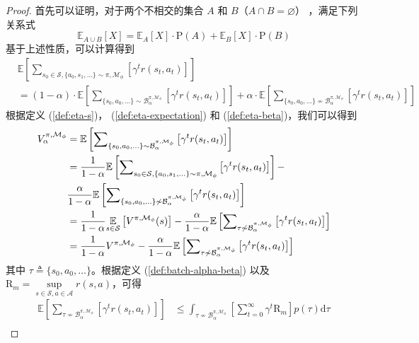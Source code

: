 \begin{proof}


首先可以证明，对于两个不相交的集合 $A$ 和 $B$（$A\cap B=\varnothing$） ，满足下列关系式
\begin{equation}
    \mathbb{E}_{A\cup B}\left[X\right] = \mathbb{E}_A\left[X\right]\cdot\mathrm{P}\left(A\right)+\mathbb{E}_B\left[X\right]\cdot\mathrm{P}\left(B\right)
\end{equation}
基于上述性质，可以计算得到
\begin{align}
    &\mathbb{E}\left[{\sum}_{s_0\in\mathcal{S},\{a_0,s_1,\ldots\} \sim\pi,\mathcal{M}_\phi}\left[\gamma^t r(s_t,a_t)\right]\right] \\
    &= (1-\alpha)\cdot \mathbb{E}\left[{\sum}_{\{s_0,a_0,\ldots\} \sim\mathcal{B}_\alpha^{\pi,\mathcal{M}_\phi}}\left[\gamma^t r(s_t,a_t)\right]\right] + \alpha\cdot\mathbb{E}\left[{\sum}_{\{s_0,a_0,\ldots\} \not\sim\mathcal{B}_\alpha^{\pi,\mathcal{M}_\phi}}\left[\gamma^t r(s_t,a_t)\right]\right]
\end{align}
根据定义 (\ref{def:eta-s})， (\ref{def:eta-expectation}) 和 (\ref{def:eta-beta})，我们可以得到
\begin{align}
{V}^{\pi,\mathcal{M}_\phi}_\alpha&=\mathbb{E}\left[{\sum}_{\{s_0,a_0,\ldots\} \sim\mathcal{B}_\alpha^{\pi,\mathcal{M}_\phi}}\left[\gamma^t r(s_t,a_t)\right]\right]\\
&=\frac{1}{1-\alpha}\mathbb{E}\left[{\sum}_{s_0\in\mathcal{S},\{a_0,s_1,\ldots\} \sim\pi,\mathcal{M}_\phi}\left[\gamma^t r(s_t,a_t)\right]\right]-\notag\\
&\frac{\alpha}{1-\alpha}\mathbb{E}\left[{\sum}_{\{s_0,a_0,\ldots\} \not\sim\mathcal{B}_\alpha^{\pi,\mathcal{M}_\phi}}\left[\gamma^t r(s_t,a_t)\right]\right]\\
&=\frac{1}{1-\alpha}\underset{s\in{\mathcal{S}}}{\mathbb{E}}\left[{V}^{\pi,\mathcal{M}_\phi}(s)\right]-\frac{\alpha}{1-\alpha}\mathbb{E}\left[{\sum}_{\tau \not\sim\mathcal{B}_\alpha^{\pi,\mathcal{M}_\phi}}\left[\gamma^t r(s_t,a_t)\right]\right]\\
&=\frac{1}{1-\alpha}{V}^{\pi,\mathcal{M}_\phi}-\frac{\alpha}{1-\alpha}\mathbb{E}\left[{\sum}_{\tau \not\sim\mathcal{B}_\alpha^{\pi,\mathcal{M}_\phi}}\left[\gamma^t r(s_t,a_t)\right]\right]\label{proof:lem42p1}
\end{align}
其中 $\tau\triangleq\{s_0,a_0,\ldots\}$。根据定义 (\ref{def:batch-alpha-beta}) 以及  $\mathrm{R}_{m}=\underset{s\in\mathcal{S},a\in\mathcal{A}}{\sup}r(s,a)$，可得
\begin{align}
\mathbb{E}\left[{\sum}_{\tau \not\sim\mathcal{B}_\alpha^{\pi,\mathcal{M}_\phi}}\left[\gamma^t r(s_t,a_t)\right]\right] &\leq\int_{\tau\not\sim{\mathcal{B}_\alpha^{\pi,\mathcal{M}_\phi}}}\left[\sum_{t=0}^\infty\gamma^t \mathrm{R}_m\right]p(\tau)\mathrm{d}\tau\\

\end{align}
\end{proof}
